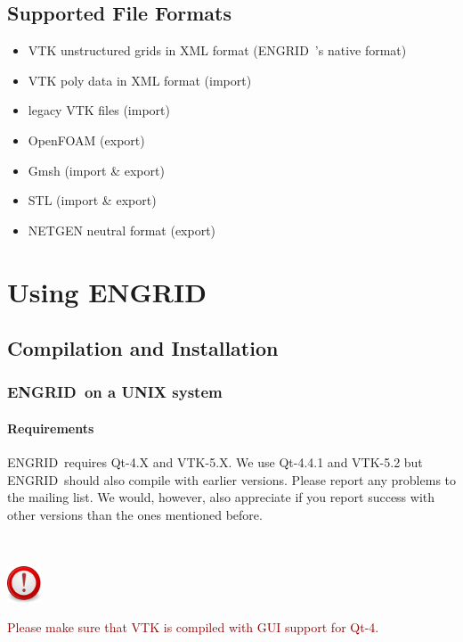 \documentclass[10pt,a4paper,british]{book}
\newcommand\eg{ENGRID\ }
\newcommand\important[1]
{
  $~$\\
  \begin{minipage}{15mm}
    \includegraphics[width=1cm]{figures/important}
  \end{minipage}
  \begin{minipage}{110mm}
    \begin{flushleft}
      {\textcolor{darkred}{#1}}
    \end{flushleft}
  \end{minipage}
  \\
  \vspace{3mm}
}
\begin{document}
\section{Supported File Formats}

\begin{itemize}
\item VTK unstructured grids in XML format (\eg's native format)
\item VTK poly data in XML format (import)
\item legacy VTK files (import)
\item OpenFOAM (export)
\item Gmsh (import \& export)
\item STL (import \& export)
\item NETGEN neutral format (export)
\end{itemize}


\chapter{Using \eg}


\section{Compilation and Installation}


\subsection{\eg on a UNIX system}

\subsubsection{Requirements}
\eg requires Qt-4.X and VTK-5.X. We use Qt-4.4.1 and VTK-5.2 but \eg should also compile with earlier versions. Please report any problems to the mailing list. We would, however, also appreciate if you report success with other versions than the ones mentioned before.

\important{Please make sure that VTK is compiled with GUI support for Qt-4.}
\end{document}
